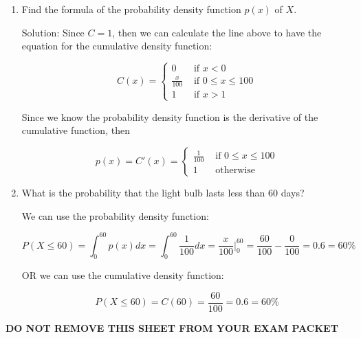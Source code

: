 \documentclass[11pt]{article}
\begin{document}
\begin{enumerate}
\begin{enumerate}
    \vfill

    \item Find the formula of the probability density function $p(x)$ of $X$.

    {\color{blue} Solution: Since $C = 1$, then we can calculate the line above to have the equation for the cumulative density function:
    
    $$C(x) = \begin{cases}
        0 &\text{ if } x < 0 \\
        \frac{x}{100} &\text{ if } 0 \leq x \leq 100 \\
        1 &\text{ if } x > 1
    \end{cases}$$
    
    Since we know the probability density function is the derivative of the cumulative function, then

    $$p(x) = C'(x) = \begin{cases}
        \frac{1}{100} &\text{ if } 0 \leq x \leq 100 \\
        1 &\text{ otherwise}
    \end{cases}$$}

    \vfill

    \item What is the probability that the light bulb lasts less than 60 days?

    {\color{blue} We can use the probability density function:
    
    $$P(X \leq 60) = \int_0^{60} p(x) dx = \int_0^{60} \frac{1}{100} dx = \frac{x}{100} \bigg|_0^{60} = \frac{60}{100} - \frac{0}{100} = 0.6 = 60\%$$
    
    OR we can use the cumulative density function:
    
    $$P(X \leq 60) = C(60) = \frac{60}{100} = 0.6 = 60\%$$}

    \vfill
\end{enumerate}




\newpage

\begin{center}
{\bf DO NOT REMOVE THIS SHEET FROM YOUR EXAM PACKET}
\end{center}


\end{enumerate}
\end{document}
